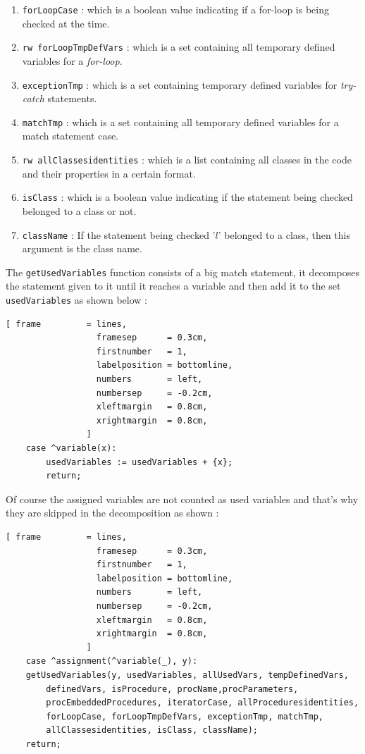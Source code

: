 \documentclass[11pt]{report}
\begin{document}
\begin{enumerate}
\item \texttt{forLoopCase} : which is a boolean value indicating if a for-loop is being checked at the time.

\item \texttt{rw forLoopTmpDefVars} : which is a set containing all temporary defined variables for a \textsl{for-loop}.

\item \texttt{exceptionTmp} : which is a set containing temporary defined variables for \textsl{try-catch} statements.

\item \texttt{matchTmp} : which is a set containing all temporary defined variables for a match statement case.

\item \texttt{rw allClassesidentities} : which is a list containing all classes in the code and their properties in a certain format.

\item \texttt{isClass} : which is a boolean value indicating if the statement being checked belonged to a class or not.

\item \texttt{className} : If the statement being checked '$l$' belonged to a class, then this argument is the class name.

\end{enumerate}

The \texttt{getUsedVariables} function consists of a big match statement, it decomposes the statement given to it until it reaches a variable and then add it to the set \texttt{usedVariables} as shown below :

\begin{Verbatim}[ frame         = lines, 
                  framesep      = 0.3cm, 
                  firstnumber   = 1,
                  labelposition = bottomline,
                  numbers       = left,
                  numbersep     = -0.2cm,
                  xleftmargin   = 0.8cm,
                  xrightmargin  = 0.8cm,
                ]
    case ^variable(x):
		usedVariables := usedVariables + {x};
		return;
\end{Verbatim}

Of course the assigned variables are not counted as used variables and that's why they are skipped in the decomposition as shown :

\begin{Verbatim}[ frame         = lines, 
                  framesep      = 0.3cm, 
                  firstnumber   = 1,
                  labelposition = bottomline,
                  numbers       = left,
                  numbersep     = -0.2cm,
                  xleftmargin   = 0.8cm,
                  xrightmargin  = 0.8cm,
                ]
    case ^assignment(^variable(_), y): 
	getUsedVariables(y, usedVariables, allUsedVars, tempDefinedVars,
	    definedVars, isProcedure, procName,procParameters,
	    procEmbeddedProcedures, iteratorCase, allProceduresidentities, 
	    forLoopCase, forLoopTmpDefVars, exceptionTmp, matchTmp,
	    allClassesidentities, isClass, className); 
	return;
\end{Verbatim}
\end{document}
